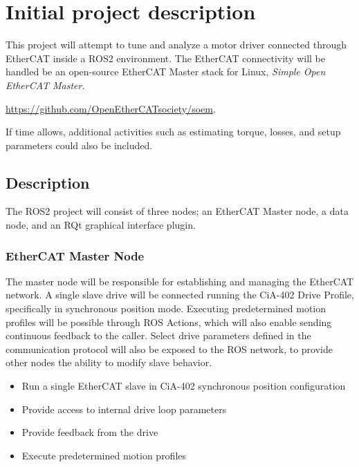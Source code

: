 \newcommand\pdescitemsep{-0.2em}
\section{Initial project description}

This project will attempt to tune and analyze a motor driver connected through EtherCAT inside a ROS2 environment. The EtherCAT connectivity will be handled be an open-source EtherCAT Master stack for Linux, \textit{Simple Open EtherCAT Master}.

\href{https://github.com/OpenEtherCATsociety/soem}{https://github.com/OpenEtherCATsociety/soem}. 

\noindent
If time allows, additional activities such as estimating torque, losses, and setup parameters could also be included. 

\subsection{Description}

\noindent
The ROS2 project will consist of three nodes; an EtherCAT Master node, a data node, and an RQt graphical interface plugin. 


\subsubsection{EtherCAT Master Node}

The master node will be responsible for establishing and managing the EtherCAT network.
A single slave drive will be connected running the CiA-402 Drive Profile, specifically in synchronous position mode.
Executing predetermined motion profiles will be possible through ROS Actions, which will also enable sending continuous feedback to the caller. 
Select drive parameters defined in the communication protocol will also be exposed to the ROS network, to provide other nodes the ability to modify slave behavior. 

\begin{itemize}
	\setlength\itemsep{\pdescitemsep}
	\item Run a single EtherCAT slave in CiA-402 synchronous position configuration
	\item Provide access to internal drive loop parameters
	\item Provide feedback from the drive
	\item Execute predetermined motion profiles
\end{itemize}

